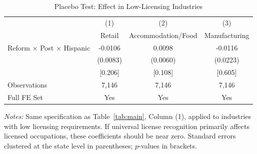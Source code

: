 \begin{table}[H]
\centering
\caption{Placebo Test: Effect in Low-Licensing Industries}
\label{tab:placebo}
\begin{threeparttable}
\begin{tabular}{lccc}
\toprule
 & (1) & (2) & (3) \\
 & Retail & Accommodation/Food & Manufacturing \\
\midrule
Reform $\times$ Post $\times$ Hispanic & -0.0106 & 0.0098 & -0.0116 \\
 & (0.0083) & (0.0060) & (0.0223) \\
 & [0.206] & [0.108] & [0.605] \\
\midrule
Observations & 7,146 & 7,146 & 7,146 \\
Full FE Set & Yes & Yes & Yes \\
\bottomrule
\end{tabular}
\begin{tablenotes}[flushleft]
\small
\item \textit{Notes:} Same specification as Table~\ref{tab:main}, Column (1), applied to industries with low licensing requirements. If universal license recognition primarily affects licensed occupations, these coefficients should be near zero. Standard errors clustered at the state level in parentheses; $p$-values in brackets.
\end{tablenotes}
\end{threeparttable}
\end{table}

